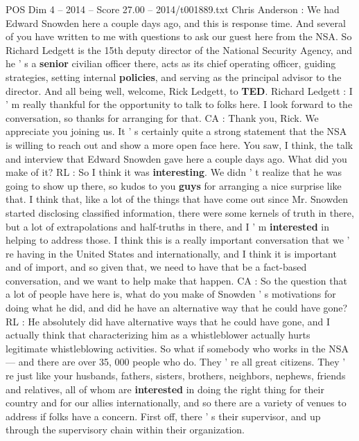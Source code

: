 \begin{textsample}{POS Dim 4 – 2014 – Score 27.00 – 2014/t001889.txt}  \label{ex:f4_pos_068}
Chris Anderson : We had Edward Snowden here a couple days ago, and this is response time.
And several of you have written to me with questions to ask our guest here from the NSA.
So Richard Ledgett is the 15th deputy director of the National Security Agency, and he ' s a \textbf{senior} civilian officer there, acts as its chief operating officer, guiding strategies, setting internal \textbf{policies}, and serving as the principal advisor to the director.
And all being well, welcome, Rick Ledgett, to \textbf{TED}.
Richard Ledgett : I ' m really thankful for the opportunity to talk to folks here.
I look forward to the conversation, so thanks for arranging for that.
CA : Thank you, Rick.
We appreciate you joining us.
It ' s certainly quite a strong statement that the NSA is willing to reach out and show a more open face here.
You saw, I think, the talk and interview that Edward Snowden gave here a couple days ago.
What did you make of it?
RL : So I think it was \textbf{interesting}.
We didn ' t realize that he was going to show up there, so kudos to you \textbf{guys} for arranging a nice surprise like that.
I think that, like a lot of the things that have come out since Mr.
Snowden started disclosing classified information, there were some kernels of truth in there, but a lot of extrapolations and half-truths in there, and I ' m \textbf{interested} in helping to address those.
I think this is a really important conversation that we ' re having in the United States and internationally, and I think it is important and of import, and so given that, we need to have that be a fact-based conversation, and we want to help make that happen.
CA : So the question that a lot of people have here is, what do you make of Snowden ' s motivations for doing what he did, and did he have an alternative way that he could have gone?
RL : He absolutely did have alternative ways that he could have gone, and I actually think that characterizing him as a whistleblower actually hurts legitimate whistleblowing activities.
So what if somebody who works in the NSA — and there are over 35, 000 people who do.
They ' re all great citizens.
They ' re just like your husbands, fathers, sisters, brothers, neighbors, nephews, friends and relatives, all of whom are \textbf{interested} in doing the right thing for their country and for our allies internationally, and so there are a variety of venues to address if folks have a concern.
First off, there ' s their supervisor, and up through the supervisory chain within their organization.

\end{textsample}
